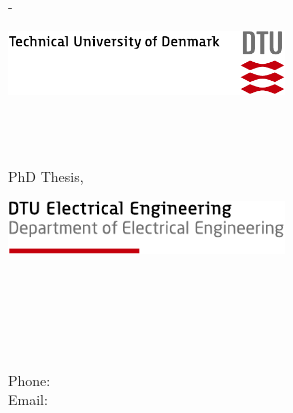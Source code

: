 \begin{titlingpage}
	\sffamily
	\thispagestyle{empty}
	\enlargethispage{0.8cm}
	\calccentering{\unitlength}
	\begin{adjustwidth}{\unitlength}{-\unitlength}
		\begin{adjustwidth}{-0.5cm}{-0.5cm}
			\vspace*{-1.1cm}
			\hfill\includegraphics[width=0.55\textwidth]{gfx/tex_dtu_uk_a1_cmyk}
			
			\begin{raggedright}
				{\Huge\thAuthors\\[2cm]}
				\begin{Spacing}{1.2}
					{\HUGE\bfseries\thTitleEN\\[1.5cm]}
					{\LARGE{PhD Thesis, \titlepagedate{}}\\[2cm]}
				\end{Spacing}
				\vspace{\stretch{2}}
			\end{raggedright}
			\noindent\includegraphics[width=0.55\textwidth]{gfx/tex_dtu_elektro_a_uk}%
		\end{adjustwidth}
	\end{adjustwidth}
	
	\cleardoublepage
	\thispagestyle{empty}
	\begin{center}
		\vspace*{\stretch{1}}
		\begin{Spacing}{2.5}
			{\HUGE\bfseries\thTitleEN}
		\end{Spacing}
		
		
		{\LARGE\thAuthors}
		
		\vspace{\stretch{2}}
		
		\thUniversityNameEN
		
		\thUniversityAddressEN
	\end{center}
	\newpage
	\thispagestyle{empty}
	
	
	\noindent
	\thUniversityNameEN\\
	\thGroupNameEN\\
	\thGroupAddressStreetEN\\
	\thGroupAddressZIPCityEN\\
	\thGroupAddressCountryEN\\
	Phone: \thGroupAddressPhone\\
	Email: \thGroupAddressEmail\\
	\thGroupAddressWWW
	
	
\end{titlingpage}